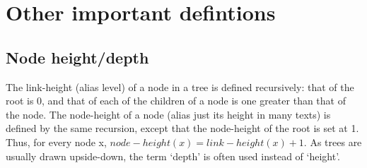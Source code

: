\documentclass[a5paper]{article}
\begin{document}
\newpage
\section*{Other important defintions}
\subsection*{Node height/depth}
The link-height (alias level) of a node in a tree is defined recursively: that of the root is 0,
and that of each of the children of a node is one greater than that of the node.
The node-height of a node (alias just its height in many texts) is defined by the same recursion,
except that the node-height of the root is set at 1.
Thus, for every node x, \(node-height(x) = link-height(x) + 1\).
As trees are usually drawn upside-down, the term `depth' is often used instead of `height'.
\end{document}
